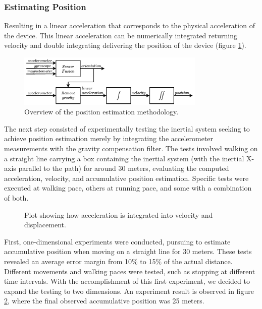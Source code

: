 \subsubsection{Estimating Position}

Resulting in a linear acceleration that corresponds to the physical acceleration of the device. This linear acceleration can be numerically integrated returning velocity and double integrating delivering the position of the device (figure \ref{fig:position_overview}).

\begin{figure}[!h]
    \centering
    \includegraphics[width=0.8\textwidth]{figures/orientation_position.pdf}
    \caption{Overview of the position estimation methodology.}
    \label{fig:position_overview}
\end{figure}

The next step consisted of experimentally testing the inertial system seeking to achieve position estimation merely by integrating the accelerometer measurements with the gravity compensation filter. The tests involved walking on a straight line carrying a box containing the inertial system (with the inertial X-axis parallel to the path) for around 30 meters, evaluating the computed acceleration, velocity, and accumulative position estimation. Specific tests were executed at walking pace, others at running pace, and some with a combination of both.

\begin{figure}[!h]
    \centering
    \resizebox{0.8\linewidth}{!}{}
    \caption{ Plot showing how acceleration is integrated into velocity and displacement. }
    \label{fig:integration}
\end{figure}

First, one-dimensional experiments were conducted, pursuing to estimate accumulative position when moving on a straight line for 30 meters. These tests revealed an average error margin from 10\% to 15\% of the actual distance. Different movements and walking paces were tested, such as stopping at different time intervals. With the accomplishment of this first experiment, we decided to expand the testing to two dimensions. An experiment result is observed in figure \ref{fig:integration}, where the final observed accumulative position was 25 meters.

